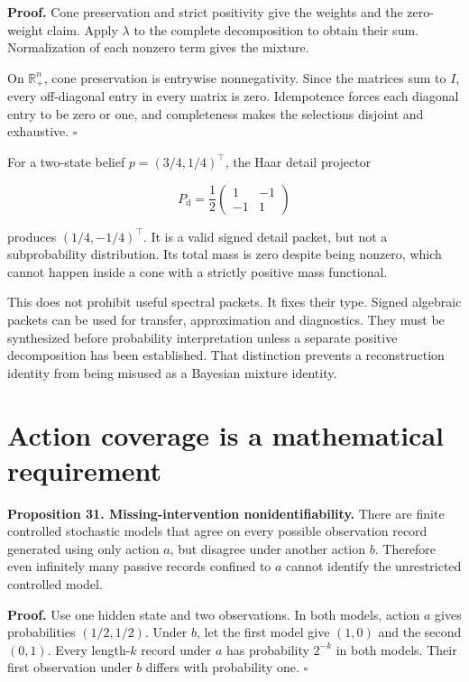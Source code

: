 \textbf{Proof.} Cone preservation and strict positivity give the weights
and the zero-weight claim. Apply \(\lambda\) to the complete
decomposition to obtain their sum. Normalization of each nonzero term
gives the mixture.

On \(\mathbb R^n_+\), cone preservation is entrywise nonnegativity.
Since the matrices sum to \(I\), every off-diagonal entry in every
matrix is zero. Idempotence forces each diagonal entry to be zero or
one, and completeness makes the selections disjoint and exhaustive.
\(\square\)

For a two-state belief \(p=(3/4,1/4)^\top\), the Haar detail projector

\[
P_{\mathrm d}=\frac12\begin{pmatrix}1&-1\\-1&1\end{pmatrix}
\]

produces \((1/4,-1/4)^\top\). It is a valid signed detail packet, but
not a subprobability distribution. Its total mass is zero despite being
nonzero, which cannot happen inside a cone with a strictly positive mass
functional.

This does not prohibit useful spectral packets. It fixes their type.
Signed algebraic packets can be used for transfer, approximation and
diagnostics. They must be synthesized before probability interpretation
unless a separate positive decomposition has been established. That
distinction prevents a reconstruction identity from being misused as a
Bayesian mixture identity.

\section{Action coverage is a mathematical requirement}\label{LSM:action-coverage-is-a-mathematical-requirement}

\textbf{Proposition 31. Missing-intervention nonidentifiability.} There
are finite controlled stochastic models that agree on every possible
observation record generated using only action \(a\), but disagree under
another action \(b\). Therefore even infinitely many passive records
confined to \(a\) cannot identify the unrestricted controlled model.

\textbf{Proof.} Use one hidden state and two observations. In both
models, action \(a\) gives probabilities \((1/2,1/2)\). Under \(b\), let
the first model give \((1,0)\) and the second \((0,1)\). Every
length-\(k\) record under \(a\) has probability \(2^{-k}\) in both
models. Their first observation under \(b\) differs with probability
one. \(\square\)

